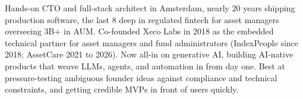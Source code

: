 \vspace{2mm}
{\fontsize{9pt}{1.3em}\bodyfontlight\upshape\color{text}
Hands-on CTO and full-stack architect in Amsterdam, nearly 20 years shipping production software, the last 8 deep in regulated fintech for asset managers overseeing \texteuro3B+ in AUM. Co-founded Xeco Labs in 2018 as the embedded technical partner for asset managers and fund administrators (IndexPeople since 2018; AssetCare 2021 to 2026). Now all-in on generative AI, building AI-native products that weave LLMs, agents, and automation in from day one. Best at pressure-testing ambiguous founder ideas against compliance and technical constraints, and getting credible MVPs in front of users quickly.\par}
\vspace{1mm}
